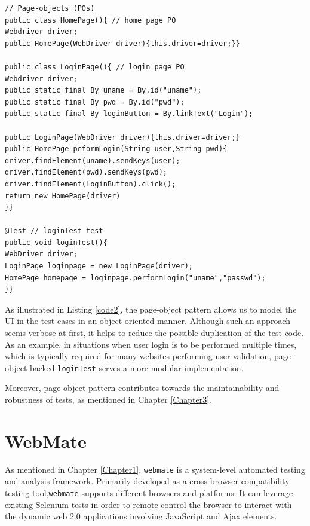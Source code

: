 \begin{center}
\begin{scriptsize}
\centering
\lstset{
  basicstyle=\ttfamily,
  columns=fullflexible,
  keepspaces=true,
}
  
\begin{lstlisting}[caption=Page-Objects design for \texttt{loginTest},label=code2]
// Page-objects (POs)
public class HomePage(){ // home page PO
Webdriver driver;
public HomePage(WebDriver driver){this.driver=driver;}}

public class LoginPage(){ // login page PO
Webdriver driver;
public static final By uname = By.id("uname");
public static final By pwd = By.id("pwd");
public static final By loginButton = By.linkText("Login");

public LoginPage(WebDriver driver){this.driver=driver;}
public HomePage peformLogin(String user,String pwd){
driver.findElement(uname).sendKeys(user);
driver.findElement(pwd).sendKeys(pwd);
driver.findElement(loginButton).click();
return new HomePage(driver)
}}

@Test // loginTest test
public void loginTest(){
WebDriver driver;
LoginPage loginpage = new LoginPage(driver);
HomePage homepage = loginpage.performLogin("uname","passwd");
}}
\end{lstlisting}
\end{scriptsize} 
\end{center}
 
As illustrated in Listing \ref{code2}, the page-object pattern allows us to model the UI in the test cases in an object-oriented manner. Although such an approach seems verbose at first, it helps to reduce the possible duplication of the test code. As an example, in situations when user login is to be performed multiple times, which is typically required for many websites performing user validation, page-object backed \texttt{loginTest} serves a more modular implementation. 

Moreover, page-object pattern contributes towards the maintainability and robustness of tests\cite{leottaPObs}, as mentioned in Chapter \ref{Chapter3}.


\section{WebMate}
\label{sec:WebMate}
As mentioned in Chapter \ref{Chapter1}, \texttt{webmate}\cite{webmate} is a system-level automated testing and analysis framework. Primarily developed as a cross-browser compatibility testing tool,\texttt{webmate} supports different browsers and platforms. It can leverage existing Selenium tests in order to remote control the browser to interact with the dynamic web 2.0 applications involving JavaScript and Ajax elements. 

